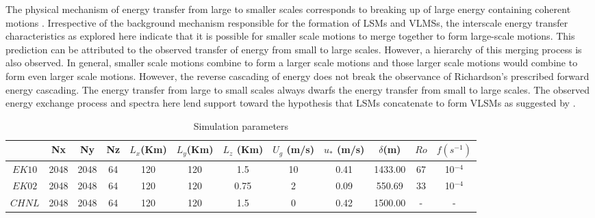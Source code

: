 The physical mechanism of energy transfer from large to smaller scales corresponds to breaking up of large energy containing coherent motions \citep[chap. 5]{davidson_turb_book}. Irrespective of the background mechanism responsible for the formation of LSMs and VLMSs, the interscale energy transfer characteristics as explored here indicate that it is possible for smaller scale motions to merge together to form large-scale motions. This prediction can be attributed to the observed transfer of energy from small to large scales. However, a hierarchy of this merging process is also observed. In general, smaller scale motions combine to form a larger scale motions and those larger scale motions would combine to form even larger scale motions. However, the reverse cascading of energy does not break the observance of Richardson's prescribed forward energy cascading. The energy transfer from large to small scales always dwarfs the energy transfer from small to large scales. The observed energy exchange process and spectra here lend support toward the hypothesis that LSMs concatenate to form VLSMs as suggested by \citet{kim_adrian_pof99, balakumar_adrian_ptrs_07, baltzer_jfm_13}.



\clearpage

\begin{table}
\centering
\footnotesize
\caption{Simulation parameters}
\centering
\begin{tabular}{ c c c c c c c c c c c c}
\hline 
 & Nx & Ny & Nz & $L_x$(Km) & $L_y$(Km) & $L_z$ (Km) & $U_g$ (m/s) & $u_*$ (m/s) & $\delta$(m) & $Ro$ & $f(s^{-1})$ \\
\hline 
$EK10$ & 2048 & 2048 & 64 & 120 & 120 & 1.5 & 10  & 0.41 & 1433.00  & 67 & 10$^{-4}$  \\
$EK02$ & 2048 & 2048 & 64 & 120 & 120 & 0.75 & 2 & 0.09 & 550.69 & 33 & 10$^{-4}$ \\
$CHNL$ & 2048 & 2048 & 64 & 120 & 120 & 1.5 & 0 & 0.42  & 1500.00 & - & - \\
\hline 
\hline 
\end{tabular}
\label{tab:sim_param}
\end{table}

